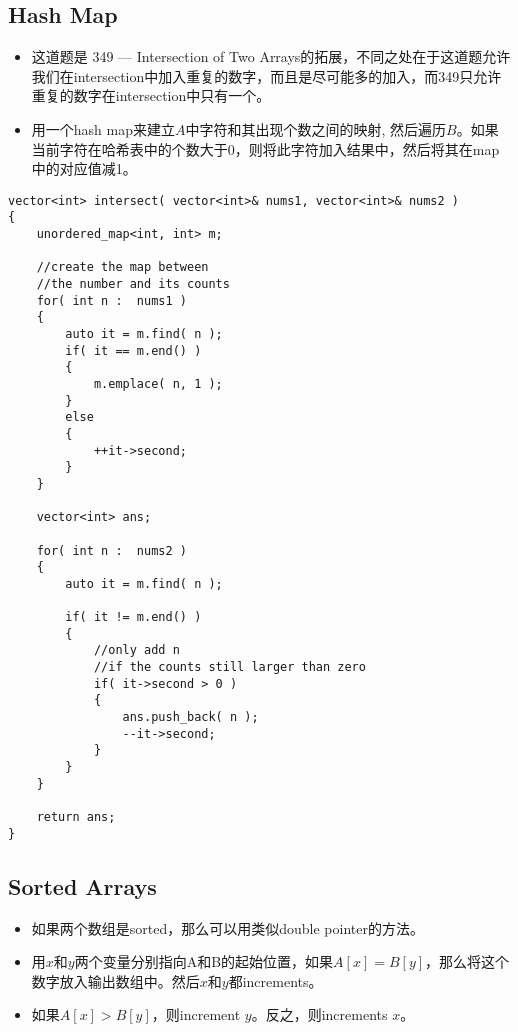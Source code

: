 \subsection{Hash Map}
\begin{itemize}
\item 这道题是 349 --- Intersection of Two Arrays的拓展，不同之处在于这道题允许我们在intersection中加入重复的数字，而且是尽可能多的加入，而349只允许重复的数字在intersection中只有一个。
\item 用一个hash map来建立$A$中字符和其出现个数之间的映射, 然后遍历$B$。如果当前字符在哈希表中的个数大于0，则将此字符加入结果中，然后将其在map中的对应值减1。
\end{itemize}

\setcounter{lstlisting}{0}
\begin{lstlisting}[style=customc, caption={Hash Set}]
vector<int> intersect( vector<int>& nums1, vector<int>& nums2 )
{
    unordered_map<int, int> m;

    //create the map between
    //the number and its counts
    for( int n :  nums1 )
    {
        auto it = m.find( n );
        if( it == m.end() )
        {
            m.emplace( n, 1 );
        }
        else
        {
            ++it->second;
        }
    }

    vector<int> ans;

    for( int n :  nums2 )
    {
        auto it = m.find( n );

        if( it != m.end() )
        {
            //only add n
            //if the counts still larger than zero
            if( it->second > 0 )
            {
                ans.push_back( n );
                --it->second;
            }
        }
    }

    return ans;
}
\end{lstlisting}

\subsection{Sorted Arrays}
\begin{itemize}
\item 如果两个数组是sorted，那么可以用类似double pointer的方法。
\item 用$ x $和$ y $两个变量分别指向A和B的起始位置，如果$A[x]=B[y]$，那么将这个数字放入输出数组中。然后$ x $和$ y $都increments。
\item 如果$A[x]>B[y]$，则increment $ y $。反之，则increments $ x $。
\end{itemize}

